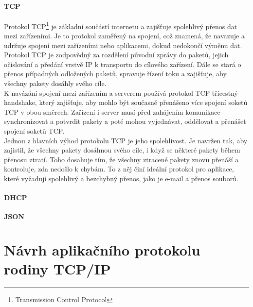 \documentclass[12pt]{report}			%
\begin{document}
				\subsection{TCP}
Protokol TCP\footnote{Transmission Control Protocol} je základní součástí internetu a zajišťuje spolehlivý přenos dat mezi zařízeními. Je to protokol zaměřený na spojení, což znamená, že navazuje a udržuje spojení mezi zařízeními nebo aplikacemi, dokud nedokončí výměnu dat.
\\
Protokol TCP je zodpovědný za rozdělení původní zprávy do paketů, jejich očíslování a předání vrstvě IP k transportu do cílového zařízení. Dále se stará o přenos případných odložených paketů, spravuje řízení toku a zajišťuje, aby všechny pakety dosáhly svého cíle.
\\
K navázání spojení mezi zařízením a serverem používá protokol TCP třícestný handshake, který zajišťuje, aby mohlo být současně přenášeno více spojení soketů TCP v obou směrech. Zařízení i server musí před zahájením komunikace synchronizovat a potvrdit pakety a poté mohou vyjednávat, oddělovat a přenášet spojení soketů TCP.
\\
Jednou z hlavních výhod protokolu TCP je jeho spolehlivost. Je navržen tak, aby zajistil, že všechny pakety dosáhnou svého cíle, i když se některé pakety během přenosu ztratí. Toho dosahuje tím, že všechny ztracené pakety znovu přenáší a kontroluje, zda nedošlo k chybám. To z něj činí ideální protokol pro aplikace, které vyžadují spolehlivý a bezchybný přenos, jako je e-mail a přenos souborů.


\cite{Pruvodce}
\cite{TCP}
\cite{TCP1}
\cite{TCP2}



				\subsection{DHCP}

\url{}
\url{}
\url{}
\url{}

				\subsection{JSON}

\url{}
\url{}
\url{}
\url{}



				\subsection{}
			

	\part{Návrh aplikačního protokolu rodiny TCP/IP}
\end{document}
